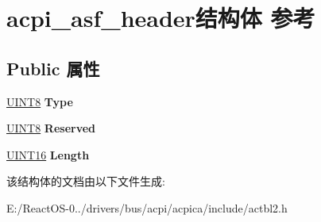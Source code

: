 \hypertarget{structacpi__asf__header}{}\section{acpi\+\_\+asf\+\_\+header结构体 参考}
\label{structacpi__asf__header}
\subsection*{Public 属性}
\begin{DoxyCompactItemize}
\item 
\mbox{\label{structacpi__asf__header_a8dfad7a16f815c50ab57c7d16fd1fe7e}} 
\hyperlink{_processor_bind_8h_ab27e9918b538ce9d8ca692479b375b6a}{U\+I\+N\+T8} {\bfseries Type}
\item 
\mbox{\label{structacpi__asf__header_ab5629ae8a064c16dd8a4c4d9ebbfd9e0}} 
\hyperlink{_processor_bind_8h_ab27e9918b538ce9d8ca692479b375b6a}{U\+I\+N\+T8} {\bfseries Reserved}
\item 
\mbox{\label{structacpi__asf__header_a26df64478afb56341ca26c69227a40e2}} 
\hyperlink{_processor_bind_8h_a09f1a1fb2293e33483cc8d44aefb1eb1}{U\+I\+N\+T16} {\bfseries Length}
\end{DoxyCompactItemize}


该结构体的文档由以下文件生成\+:\begin{DoxyCompactItemize}
\item 
E\+:/\+React\+O\+S-\/0../drivers/bus/acpi/acpica/include/actbl2.\+h\end{DoxyCompactItemize}
